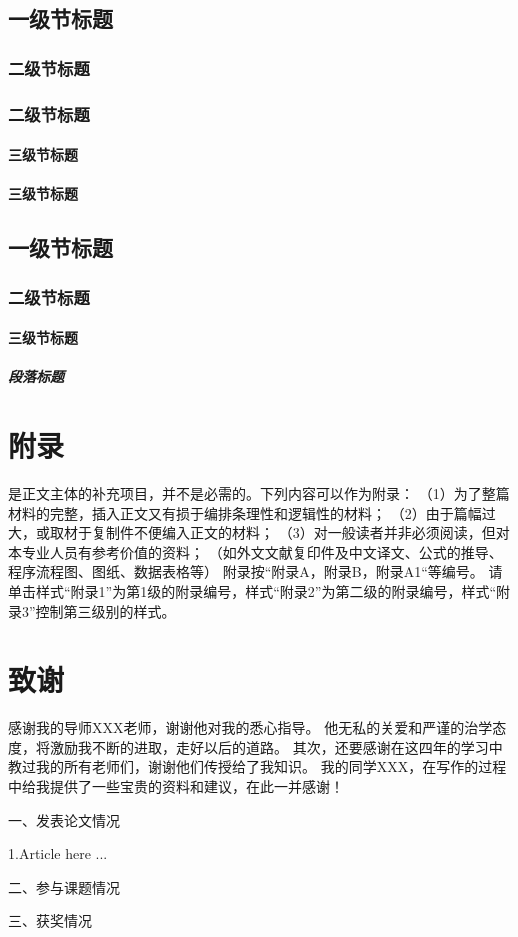 \documentclass{QHUMaster}
\begin{document}
\section{一级节标题}
\subsection{二级节标题}
\subsection{二级节标题}
\subsubsection{三级节标题}
\subsubsection{三级节标题}
\section{一级节标题}
\subsection{二级节标题}
\subsubsection{三级节标题}
\paragraph{段落标题}


\backmatter
\printbib

\chapter{附\quad 录}
\songti{} 

是正文主体的补充项目，并不是必需的。下列内容可以作为附录：
（1）为了整篇材料的完整，插入正文又有损于编排条理性和逻辑性的材料；
（2）由于篇幅过大，或取材于复制件不便编入正文的材料；
（3）对一般读者并非必须阅读，但对本专业人员有参考价值的资料；
（如外文文献复印件及中文译文、公式的推导、程序流程图、图纸、数据表格等）
附录按“附录A，附录B，附录A1“等编号。
请单击样式“附录1”为第1级的附录编号，样式“附录2”为第二级的附录编号，样式“附录3”控制第三级别的样式。

\chapter{致\quad 谢}
\songti{} 

感谢我的导师XXX老师，谢谢他对我的悉心指导。
他无私的关爱和严谨的治学态度，将激励我不断的进取，走好以后的道路。
其次，还要感谢在这四年的学习中教过我的所有老师们，谢谢他们传授给了我知识。
我的同学XXX，在写作的过程中给我提供了一些宝贵的资料和建议，在此一并感谢！

\Achievements
一、发表论文情况

1.Article here ...

\blank

二、参与课题情况

三、获奖情况
\end{document}
